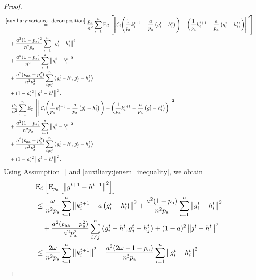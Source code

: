 \documentclass{article}
\newcommand*{\probavailable}{\ensuremath{p_{\textnormal{a}}}}
\newcommand*{\probpairaa}{\ensuremath{p_{\textnormal{aa}}}}
\begin{document}
\begin{proof}
\begin{align*}
    &\overset{\eqref{auxiliary:variance_decomposition}}{=}\frac{\probavailable}{n^2}\sum_{i=1}^n\ExpSub{\cC}{\norm{\cC_i\Bigg(\frac{1}{\probavailable}k^{t+1}_i - \frac{a}{\probavailable} \left(g^{t}_i - h^{t}_i\right)\Bigg) - \left(\frac{1}{\probavailable}k^{t+1}_i - \frac{a}{\probavailable} \left(g^{t}_i - h^{t}_i\right)\right)}^2} \\
    &\quad +\frac{a^2 (1 - \probavailable)^2}{n^2 \probavailable}\sum_{i=1}^n\norm{g^{t}_i - h^{t}_i}^2 \\
    &\quad+ \frac{a^2 (1 - \probavailable)}{n^2}\sum_{i=1}^n\norm{g^{t}_i - h^{t}_i}^2 \\
    &\quad +\frac{a^2 (\probpairaa - \probavailable^2)}{n^2 \probavailable^2}\sum_{i \neq j}^n\inp{g^{t}_i - h^{t}}{g^{t}_j - h^{t}_j} \\
    &\quad + (1 - a)^2\norm{g^{t} - h^{t}}^2.\\
    &=\frac{\probavailable}{n^2}\sum_{i=1}^n\ExpSub{\cC}{\norm{\cC_i\Bigg(\frac{1}{\probavailable}k^{t+1}_i - \frac{a}{\probavailable} \left(g^{t}_i - h^{t}_i\right)\Bigg) - \left(\frac{1}{\probavailable}k^{t+1}_i - \frac{a}{\probavailable} \left(g^{t}_i - h^{t}_i\right)\right)}^2} \\
    &\quad +\frac{a^2 (1 - \probavailable)}{n^2 \probavailable}\sum_{i=1}^n\norm{g^{t}_i - h^{t}_i}^2 \\
    &\quad +\frac{a^2 (\probpairaa - \probavailable^2)}{n^2 \probavailable^2}\sum_{i \neq j}^n\inp{g^{t}_i - h^{t}}{g^{t}_j - h^{t}_j} \\
    &\quad + (1 - a)^2\norm{g^{t} - h^{t}}^2.\\
  \end{align*}
  Using Assumption~\ref{} and \eqref{auxiliary:jensen_inequality}, we obtain
  \begin{align*}
    &\ExpSub{\cC}{\ExpSub{\probavailable}{\norm{g^{t+1} - h^{t+1}}^2}} \\
    &\leq\frac{\omega}{n^2 \probavailable}\sum_{i=1}^n\norm{k^{t+1}_i - a \left(g^{t}_i - h^{t}_i\right)}^2 +\frac{a^2 (1 - \probavailable)}{n^2 \probavailable}\sum_{i=1}^n\norm{g^{t}_i - h^{t}_i}^2 \\
    &\quad +\frac{a^2 (\probpairaa - \probavailable^2)}{n^2 \probavailable^2}\sum_{i \neq j}^n\inp{g^{t}_i - h^{t}}{g^{t}_j - h^{t}_j} + (1 - a)^2\norm{g^{t} - h^{t}}^2.\\
    &\leq\frac{2 \omega}{n^2 \probavailable}\sum_{i=1}^n\norm{k^{t+1}_i}^2 +\frac{a^2 (2 \omega + 1 - \probavailable)}{n^2 \probavailable}\sum_{i=1}^n\norm{g^{t}_i - h^{t}_i}^2 \\

\end{align*}
\end{proof}
\end{document}
